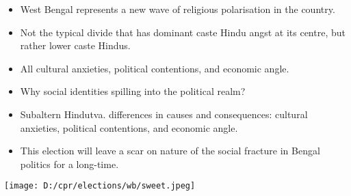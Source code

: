 \documentclass[
  ignorenonframetext,
]{beamer}
\begin{document}
\begin{frame}
\begin{itemize}
\item
  West Bengal represents a new wave of religious polarisation in the
  country.
\item
  Not the typical divide that has dominant caste Hindu angst at its
  centre, but rather lower caste Hindus.
\item
  All cultural anxieties, political contentions, and economic angle.
\item
  Why social identities spilling into the political realm?
\item
  Subaltern Hindutva. differences in causes and consequences: cultural
  anxieties, political contentions, and economic angle.
\item
  This election will leave a scar on nature of the social fracture in
  Bengal politics for a long-time.
\end{itemize}
\end{frame}

\begin{frame}
\texttt{[image: D:/cpr/elections/wb/sweet.jpeg]}
\end{frame}
\end{document}
